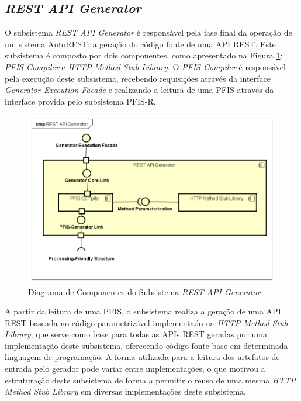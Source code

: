
\subsection{\textit{REST API Generator}}

O subsistema \textit{REST API Generator} é responsável pela fase final da operação de um sistema AutoREST: a geração do código fonte de uma API REST. Este subsistema é composto por dois componentes, como apresentado na Figura \ref{fig_gencomp}: \textit{PFIS Compiler} e \textit{HTTP Method Stub Library}. O \textit{PFIS Compiler} é responsável pela execução deste subsistema, recebendo requisições através da interface \textit{Generator Execution Facade} e realizando a leitura de uma PFIS através da interface provida pelo subsistema PFIS-R.

\begin{figure}[htb]
    \begin{center}
        \includegraphics[scale=0.65]{imagens/REST_API_Generator_Subcomponent_Diagram.png}
    \end{center}
	\caption{\label{fig_gencomp}Diagrama de Componentes do Subsistema \textit{REST API Generator}}
\end{figure}

A partir da leitura de uma PFIS, o subsistema realiza a geração de uma API REST baseada no código parametrizável implementado na \textit{HTTP Method Stub Library}, que serve como base para todas as APIs REST geradas por uma implementação deste subsistema, oferecendo código fonte base em determinada linguagem de programação. A forma utilizada para a leitura dos artefatos de entrada pelo gerador pode variar entre implementações, o que motivou a estruturação deste subsistema de forma a permitir o reuso de uma mesma \textit{HTTP Method Stub Library} em diversas implementações deste subsistema.

